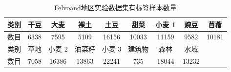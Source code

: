 \begin{table}[h]
    \caption{Felvoand地区实验数据集有标签样本数量}
    \begin{tabular}{|c|c|c|c|c|c|c|c|c|}
        \hline 类别 & 干豆   & 大麦    & 裸土    & 土豆    & 甜菜    & 小麦 1  & 豌豆    & 苜蓿
        \\
        \hline 数目 & 6338 & 7595  & 5109  & 16156 & 10033 & 11159 & 9582  & 10181 \\
        \hline 类别 & 草地   & 小麦 2  & 油菜籽   & 小麦 3  & 建筑物   & 森林    & 水域    &       \\
        \hline 数目 & 7058 & 16386 & 13863 & 22241 & 735   & 18044 & 13232 &       \\
        \hline
    \end{tabular}
    \label{flevoland_smaple}
\end{table}

